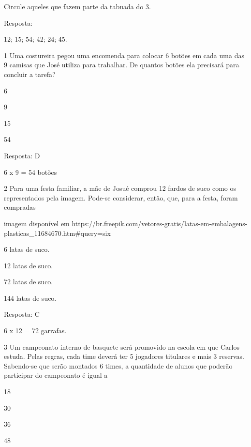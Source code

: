 \begin{escolha}
Circule aqueles que fazem parte da tabuada do 3.

Resposta:

12; 15; 54; 42; 24; 45.


\num{1} Uma costureira pegou uma encomenda para colocar 6 botões em
cada uma das 9 camisas que José utiliza para trabalhar. De quantos botões
ela precisará para concluir a tarefa?

\begin{escolha}
    \item 6
    \item 9
    \item 15
    \item 54
\end{escolha}

Resposta: D

6 x 9 = 54 botões

\num{2} Para uma festa familiar, a mãe de Josué comprou 12 fardos de
suco como os representados pela imagem. Pode-se considerar, então, que, para a festa, foram compradas

\Incluir imagem disponível em https://br.freepik.com/vetores-gratis/latas-em-embalagens-plasticas_11684670.htm#query=six%

\begin{escolha}

\item
  6 latas de suco.
\item
  12 latas de suco.
\item
  72 latas de suco.
\item
  144 latas de suco.
\end{escolha}

Resposta: C

6 x 12 = 72 garrafas.

\num{3} Um campeonato interno de basquete será promovido na escola em que Carlos
estuda. Pelas regras, cada time deverá ter 5 jogadores titulares e mais 3 reservas. Sabendo-se que serão montados 6 times, a quantidade de alunos
que poderão participar do campeonato é igual a

\begin{escolha}

\item
  18
\item
  30
\item
  36
\item
  48
\end{escolha}


\end{escolha}
